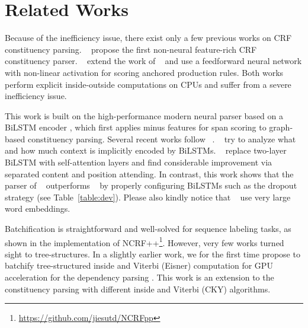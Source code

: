 \documentclass{article}
\begin{document}
%
  \section{Related Works}
\label{section:relwork}








Because of the inefficiency issue, there exist only a few previous works on CRF constituency parsing.
\citeauthor{finkel-etal-2008-efficient}~ propose the first non-neural feature-rich CRF constituency parser.
\citeauthor{durrett-klein-2015-neural}~ extend the work of \citeauthor{finkel-etal-2008-efficient}~ and use a feedforward neural network with non-linear activation for scoring anchored production rules.
Both works perform explicit inside-outside computations on CPUs and suffer from a severe inefficiency issue.


This work is built on the high-performance modern neural parser based on a BiLSTM encoder \cite{stern-etal-2017-minimal}, which first applies minus features \cite{cross-huang-2016-span} for span scoring to graph-based constituency parsing.
Several recent works follow \citeauthor{stern-etal-2017-minimal}~.
\citeauthor{gaddy-etal-2018-whats}~ try to analyze what and how much context is implicitly encoded by BiLSTMs.
\citeauthor{kitaev-klein-2018-constituency}~ replace two-layer BiLSTM with self-attention layers and find considerable improvement via separated content and position attending.
In contrast, this work shows that the parser of \citeauthor{stern-etal-2017-minimal}~ outperforms \citeauthor{kitaev-klein-2018-constituency}~ by properly configuring  BiLSTMs such as the dropout strategy (see Table~\ref{table:dev}). Please also kindly notice that \citeauthor{kitaev-klein-2018-constituency}~ use very large word embeddings.

Batchification is straightforward and well-solved for sequence labeling tasks, as shown in the implementation of NCRF++\footnote{\url{https://github.com/jiesutd/NCRFpp}}.
However, very few works turned sight to tree-structures.
In a slightly earlier work, we for the first time propose to batchify tree-structured inside and Viterbi (Eisner) computation for GPU acceleration for the dependency parsing \cite{zhang-etal-2020-efficient}.
This work is an extension to the constituency parsing with different inside and Viterbi (CKY) algorithms.
\end{document}
